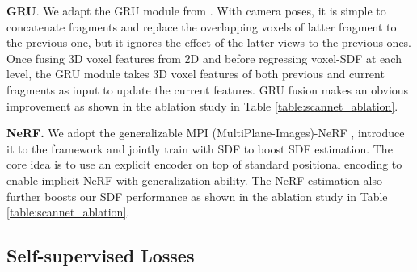 \noindent
\textbf{GRU}. 
We adapt the GRU module from \cite{neucon}. With camera poses, it is simple to concatenate fragments and replace the overlapping voxels of latter fragment to the previous one, but it ignores the effect of the latter views to the previous ones. Once fusing 3D voxel features from 2D and before regressing voxel-SDF at each level, the GRU module takes 3D voxel features of both previous and current fragments as input to update the current features. GRU fusion makes an obvious improvement as shown in the ablation study in Table \ref{table:scannet_ablation}. 


\noindent
\textbf{NeRF.} We adopt the generalizable MPI (MultiPlane-Images)-NeRF \cite{mpi, mpi-nerf, mononerf}, introduce it to the framework and jointly train with SDF to boost SDF estimation. The core idea is to use an explicit encoder on top of standard positional encoding to enable implicit NeRF with generalization ability. The NeRF estimation also further boosts our SDF performance as shown in the ablation study in Table \ref{table:scannet_ablation}.

\subsection{Self-supervised Losses}
\label{sec:losses}

